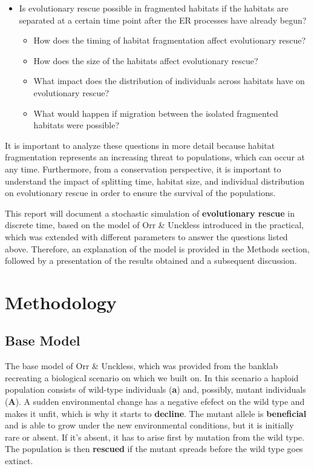 \documentclass[
]{article}
\begin{document}
\begin{itemize}
\item
  Is evolutionary rescue possible in fragmented habitats if the habitats
  are separated at a certain time point after the ER processes have
  already begun?

  \begin{itemize}
  \item
    How does the timing of habitat fragmentation affect evolutionary
    rescue?
  \item
    How does the size of the habitats affect evolutionary rescue?
  \item
    What impact does the distribution of individuals across habitats
    have on evolutionary rescue?
  \item
    What would happen if migration between the isolated fragmented
    habitats were possible?
  \end{itemize}
\end{itemize}

It is important to analyze these questions in more detail because
habitat fragmentation represents an increasing threat to populations,
which can occur at any time. Furthermore, from a conservation
perspective, it is important to understand the impact of splitting time,
habitat size, and individual distribution on evolutionary rescue in
order to ensure the survival of the populations.

This report will document a stochastic simulation of
\textbf{evolutionary rescue} in discrete time, based on the model of Orr
\& Unckless introduced in the practical, which was extended with
different parameters to answer the questions listed above. Therefore, an
explanation of the model is provided in the Methods section, followed by
a presentation of the results obtained and a subsequent discussion.

\section{Methodology}\label{methodology}

\subsection{Base Model}\label{base-model}

The base model of Orr \& Unckless, which was provided from the banklab
recreating a biological scenario on which we built on. In this scenario
a haploid population consists of wild-type individuals (\textbf{a}) and,
possibly, mutant individuals (\textbf{A}). A sudden environmental change
has a negative efefect on the wild type and makes it unfit, which is why
it starts to \textbf{decline}. The mutant allele is \textbf{beneficial}
and is able to grow under the new environmental conditions, but it is
initially rare or absent. If it's absent, it has to arise first by
mutation from the wild type. The population is then \textbf{rescued} if
the mutant spreads before the wild type goes extinct.
\end{document}
